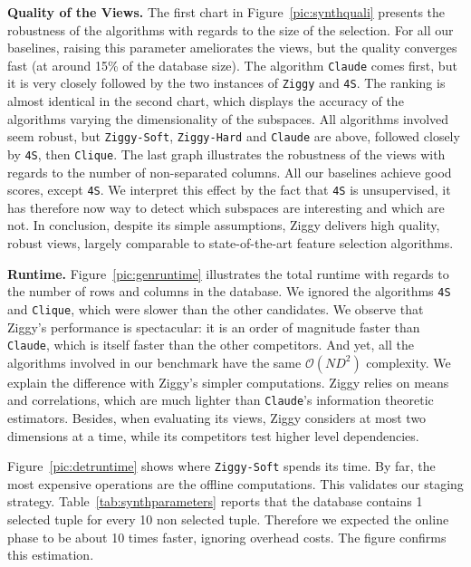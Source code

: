 \textbf{Quality of the Views.} The first chart in Figure~\ref{pic:synthquali}
presents the robustness of the algorithms with regards to the size of the
selection. For all our baselines, raising this parameter ameliorates the views, 
but the quality converges fast (at around 15\% of the database size).  The
algorithm \texttt{Claude} comes first, but it is very closely followed by the
two instances of \texttt{Ziggy} and \texttt{4S}. The ranking is almost
identical in the second chart, which displays the accuracy of the algorithms
varying the dimensionality of the subspaces. All algorithms involved seem
robust, but \texttt{Ziggy-Soft}, \texttt{Ziggy-Hard} and \texttt{Claude}
are above, followed closely by \texttt{4S}, then
\texttt{Clique}. The last graph illustrates the robustness of the views with
regards to the number of non-separated columns.  All our baselines achieve good
scores, except \texttt{4S}. We interpret this effect by the fact that
\texttt{4S} is unsupervised, it has therefore now way to detect which subspaces
are interesting and which are not. In conclusion, despite its simple
assumptions, Ziggy delivers high quality, robust views, largely comparable to
state-of-the-art feature selection algorithms.

\textbf{Runtime.} Figure~\ref{pic:genruntime} illustrates the total runtime
with regards to the number of rows and columns in the database. We ignored the
algorithms \texttt{4S} and \texttt{Clique}, which were slower than the other
candidates. We observe that Ziggy's performance is spectacular: it is an order
of magnitude faster than \texttt{Claude}, which is itself faster than the other
competitors. And yet, all the algorithms involved in our benchmark have the
same $\mathcal{O}(ND^2)$ complexity. We explain the difference with Ziggy's
simpler computations. Ziggy relies on means and correlations, which are much
lighter than \texttt{Claude}'s information theoretic estimators. Besides, when
evaluating its views, Ziggy considers at most two dimensions at a time, while
its competitors test higher level dependencies.

Figure~\ref{pic:detruntime} shows where \texttt{Ziggy-Soft} spends its time.
By far, the most expensive operations are the offline computations. This
validates our staging strategy.  Table~\ref{tab:synthparameters} reports that
the database contains 1 selected tuple for every 10 non selected tuple.
Therefore we expected the online phase to be about 10 times faster, ignoring
overhead costs. The figure confirms this estimation.

